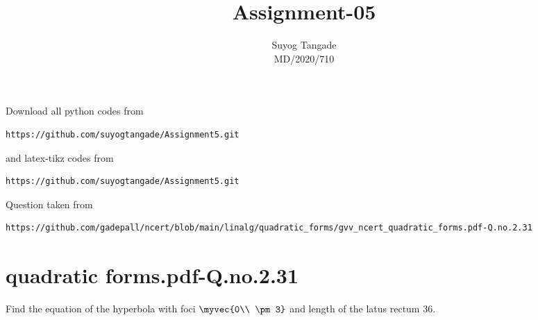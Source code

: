 \documentclass[journal,12pt,twocolumn]{IEEEtran}
\begin{document}
\def\rightbox#1{\makebox[0in][r]{#1}}
\def\centbox#1{\makebox[0in]{#1}}
\def\topbox#1{\raisebox{-\baselineskip}[0in][0in]{#1}}
\def\midbox#1{\raisebox{-0.5\baselineskip}[0in][0in]{#1}}
\vspace{3cm}
\title{Assignment-05}
\author{Suyog Tangade\\MD/2020/710}
\maketitle
\newpage
\bigskip
\renewcommand{\thefigure}{\theenumi}
\renewcommand{\thetable}{\theenumi}
Download all python codes from
\begin{lstlisting}
https://github.com/suyogtangade/Assignment5.git
\end{lstlisting}
%
and latex-tikz codes from
%
\begin{lstlisting}
https://github.com/suyogtangade/Assignment5.git
\end{lstlisting}
%
Question taken from
\begin{lstlisting}
https://github.com/gadepall/ncert/blob/main/linalg/quadratic_forms/gvv_ncert_quadratic_forms.pdf-Q.no.2.31
\end{lstlisting}
%
\section{quadratic forms.pdf-Q.no.2.31}
Find the equation of the hyperbola with foci $\myvec{0\\ \pm 3}$ and length of the latus rectum 36.
\end{document}
